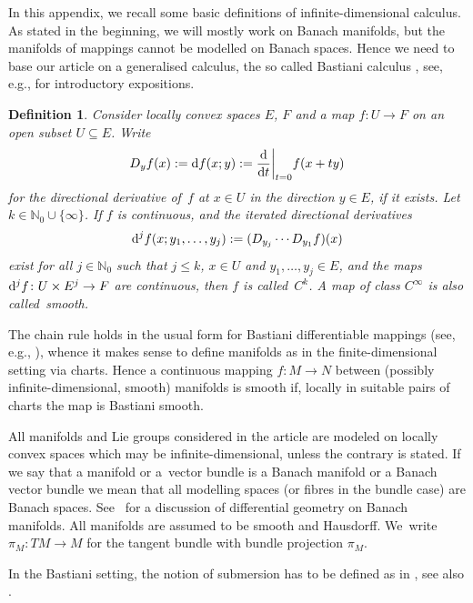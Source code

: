 \documentclass[pdftex]{sigma}
\numberwithin{equation}{section}
\newtheorem{Definition}[Theorem]{Definition}
\newtheorem{setup}[Theorem]{}
\newcommand{\N}{\ensuremath{\mathbb{N}}}
\begin{document}
In this appendix, we recall some basic definitions of infinite-dimensional calculus.
As stated in the beginning, we will mostly work on Banach manifolds, but the manifolds of mappings cannot be modelled on Banach spaces. Hence we need to base our article on a generalised calculus, the so called Bastiani calculus \cite{Bas64}, see, e.g., \cite{GaS22, Sch23} for introductory expositions.

\begin{Definition}%
Consider locally convex spaces $E$, $F$
and a map $f\colon U\rightarrow F$ on an open subset $U\subseteq E$.
Write
\[
D_yf(x):= {\rm d}f(x;y):= \frac{{\rm d}}{{\rm d}t}\biggr|_{t=0}f(x+ty)
\]
for the directional derivative of~$f$ at $x\in U$
in the direction $y\in E$, if it exists.
Let $k\in \N_0\cup\{\infty\}$.
If $f$ is continuous, and the iterated directional derivatives
\[
{\rm d}^jf(x;y_1,\dots, y_j):= (D_{y_j}\cdots D_{y_1}f)(x)
\]
exist for all $j\in\N_0$ such that
$j\leq k$, $x\in U$ and $y_1,\dots, y_j\in E$,
and the maps ${\rm d}^jf\colon U\times E^j\to F$
are continuous, then $f$ is called~$C^k$.
A map of class $C^\infty$ is also called~\emph{smooth}.
\end{Definition}

The chain rule holds in the usual form for Bastiani differentiable mappings (see, e.g., \cite[Proposition~1.23]{Sch23}), whence it makes sense to define manifolds as in the finite-dimensional setting via charts. Hence a continuous mapping $f \colon M \rightarrow N$ between (possibly infinite-dimensional, smooth) manifolds is smooth if, locally in suitable pairs of charts the map is Bastiani smooth.

All manifolds and Lie groups considered
in the article are modeled on locally
convex spaces which may be infinite-dimensional,
unless the contrary is stated. If we say that a manifold or a~vector bundle is a Banach manifold or a Banach vector bundle we mean that all modelling spaces (or fibres in the bundle case) are Banach spaces. See~\cite{La01} for a discussion of differential geometry on Banach manifolds. All manifolds are assumed to be smooth and Hausdorff.
We~write~$\pi_M \colon TM \rightarrow M$ for the tangent bundle with bundle projection $\pi_M$.

In the Bastiani setting, the notion of submersion has to be defined as in \cite[Definition 4.4.8]{Ham82}, see also \cite{Sch23}.
\end{document}
